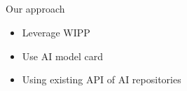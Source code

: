 \subsection{\slidetitle}
\begin{frame}
  \frametitle{\sectiontitle}
  \framesubtitle{\slidetitle}

  \begin{minipage}[h!]{0.60\textwidth}

    Our approach
    \begin{itemize}
      \item Leverage WIPP
      \item Use AI model card
      \item Using existing API of AI repositories
    \end{itemize}

    \bigskip


\end{minipage}
\end{frame}
